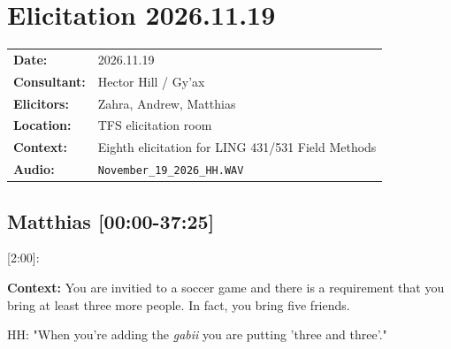\renewcommand{\ElicitationDate}{2026.11.19}

\section{Elicitation \ElicitationDate}

\begin{tabular}{ll}
\textbf{Date:} & \ElicitationDate \\
\textbf{Consultant:} & Hector Hill / Gy'ax \\
\textbf{Elicitors:} & Zahra, Andrew, Matthias \\
\textbf{Location:} & TFS elicitation room \\
\textbf{Context:} & Eighth elicitation for LING 431/531 Field Methods \\
\textbf{Audio:} & \texttt{November\_19\_2026\_HH.WAV} \\
\end{tabular}

\subsection{Matthias [00:00-37:25]}

[2:00]:

\textbf{Context: }You are invitied to a soccer game and there is a requirement that you bring at least three more people. In fact, you bring five friends.

HH: "When you're adding the \textit{g̱abii} you are putting 'three and three'."

